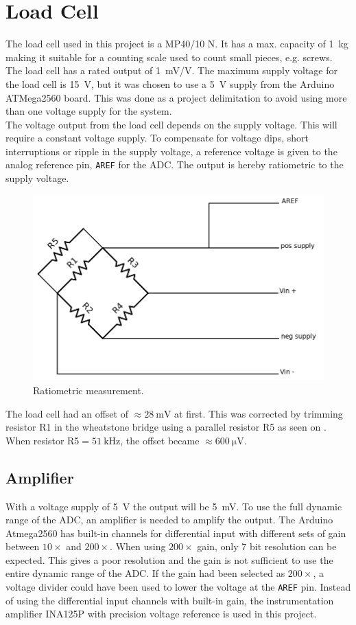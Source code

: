 \section{Load Cell}
The load cell used in this project is a MP40/10 N. \cite{DS-MP40} 
It has a max. capacity of \SI{1}{\kilogram} making it suitable for a counting scale used to count small pieces, e.g. screws. 
The load cell has a rated output of \SI{1}{\milli\volt/\volt}.
The maximum supply voltage for the load cell is \SI{15}{\volt}, but it was chosen to use a \SI{5}{\volt} supply from the Arduino ATMega2560 board. 
This was done as a project delimitation to avoid using more than one voltage supply for the system. \\

The voltage output from the load cell depends on the supply voltage. 
This will require a constant voltage supply. 
To compensate for voltage dips, short interruptions or ripple in the supply voltage, a reference voltage is given to the analog reference pin, \texttt{AREF} for the ADC. 
The output is hereby ratiometric to the supply voltage.

\begin{figure}[H]
	\centering
	\includegraphics[width=0.6\linewidth]{graphics/loadcell}
	\caption{Ratiometric measurement.}
	\label{fig:loadcell}
\end{figure}

The load cell had an offset of $\approx\SI{28}{\milli\volt}$ at first. 
This was corrected by trimming resistor R1 in the wheatstone bridge using a parallel resistor R5 as seen on .
When resistor R5$=\SI{51}{\kilo\hertz}$, the offset became $\approx \SI{600}{\micro\volt}$. 

\subsection{Amplifier}
With a voltage supply of \SI{5}{\volt} the output will be \SI{5}{\milli\volt}.
To use the full dynamic range of the ADC, an amplifier is needed to amplify the output.
The Arduino Atmega2560 has built-in channels for differential input with different sets of gain between $10\times$ and $200\times$.
When using $200\times$ gain, only 7 bit resolution can be expected. \cite[p.~268]{ATmega2560}
This gives a poor resolution and the gain is not sufficient to use the entire dynamic range of the ADC. 
If the gain had been selected as $200\times$, a voltage divider could have been used to lower the voltage at the \texttt{AREF} pin.
Instead of using the differential input channels with built-in gain, the instrumentation amplifier INA125P with precision voltage reference is used in this project. \cite{INA125}

